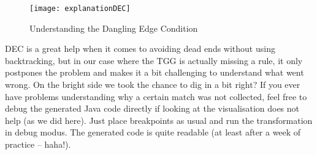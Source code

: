 \begin{figure}[htbp]
\begin{center}
  \texttt{[image: explanationDEC]}
  \caption{Understanding the Dangling Edge Condition}
  \label{fig:dec}
\end{center}
\end{figure}

DEC is a great help when it comes to avoiding dead ends without using backtracking, but in our case where the TGG is actually missing a rule, it only postpones the problem and makes it a bit challenging to understand what went wrong.
On the bright side we took the chance to dig in a bit right?
If you ever have problems understanding why a certain match was not collected, feel free to debug the generated Java code directly if looking at the visualisation does not help (as we did here).
Just place breakpoints as usual and run the transformation in debug modus.
The generated code is quite readable (at least after a week of practice -- haha!).





